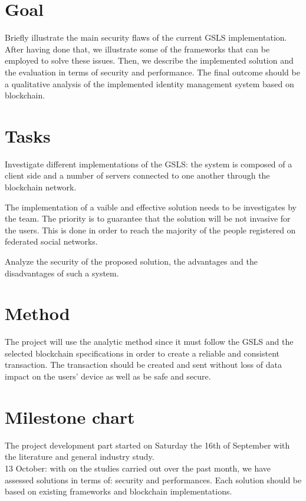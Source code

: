 \documentclass[paper=a4, fontsize=11pt]{scrartcl} %
\numberwithin{equation}{section} %
\numberwithin{figure}{section} %
\numberwithin{table}{section} %
\begin{document}
\section{Goal}
Briefly illustrate the main security flaws of the current GSLS implementation. After having done that, we illustrate some of the frameworks that can be employed to solve these issues. Then, we describe the implemented solution and the evaluation in terms of security and performance. The final outcome should be a qualitative analysis of the implemented identity management system based on blockchain. 

\section{Tasks}

Investigate different implementations of the GSLS: the system is composed of a client side and a number of servers connected to one another through the blockchain network. 

The implementation of a vaible and effective solution needs to be investigates by the team. The priority is to guarantee that the solution will be not invasive for the users. This is done in order to reach the majority of the people registered on federated social networks.

Analyze the security of the proposed solution, the advantages and the disadvantages of such a system.


\section{Method}

The project will use the analytic method since it must follow the GSLS and the selected blockchain specifications in order to create a reliable and consistent transaction. The transaction should be created and sent without loss of data impact on the users' device as well as be safe and secure.

\section{Milestone chart}

The project development part started on Saturday the 16th of September with the literature and general industry study. \\

13 October: with on the studies carried out over the past month, we have assessed solutions in terms of: security and performances. Each solution should be based on existing frameworks and blockchain implementations. \\
\end{document}
